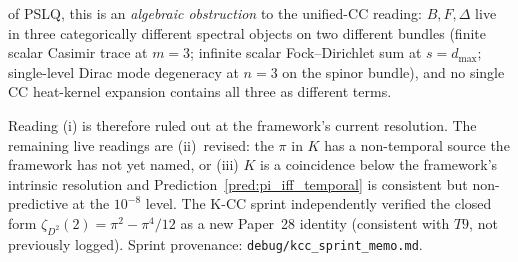 \documentclass[11pt]{article}
\begin{document}
\begin{enumerate}
\begin{enumerate}
of PSLQ, this is an \emph{algebraic obstruction} to the
unified-CC reading: $B, F, \Delta$ live in three categorically
different spectral objects on two different bundles (finite scalar
Casimir trace at $m=3$; infinite scalar Fock--Dirichlet sum at
$s = d_\text{max}$; single-level Dirac mode degeneracy at $n=3$ on
the spinor bundle), and no single CC heat-kernel expansion contains
all three as different terms.
\end{enumerate}
Reading (i) is therefore ruled out at the framework's current
resolution.  The remaining live readings are (ii)~revised: the $\pi$
in $K$ has a non-temporal source the framework has not yet named, or
(iii) $K$ is a coincidence below the framework's intrinsic resolution
and Prediction~\ref{pred:pi_iff_temporal} is consistent but
non-predictive at the $10^{-8}$ level.  The K-CC sprint independently
verified the closed form $\zeta_{D^2}(2) = \pi^2 - \pi^4/12$ as a
new Paper~28 identity (consistent with $T9$, not previously logged).
Sprint provenance: \texttt{debug/kcc\_sprint\_memo.md}.


\end{enumerate}
\end{document}
